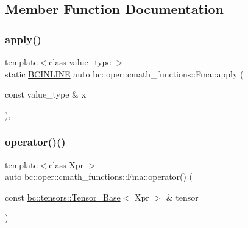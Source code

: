 \subsection{Member Function Documentation}
\mbox{\label{structbc_1_1oper_1_1cmath__functions_1_1Fma_aa1cd252de7fcdcc34a5f915522562711}} 
\subsubsection{\texorpdfstring{apply()}{apply()}}
{\footnotesize\ttfamily template$<$class value\+\_\+type $>$ \\
static \hyperlink{common_8h_a6699e8b0449da5c0fafb878e59c1d4b1}{B\+C\+I\+N\+L\+I\+NE} auto bc\+::oper\+::cmath\+\_\+functions\+::\+Fma\+::apply (\begin{DoxyParamCaption}\item[{const value\+\_\+type \&}]{x }\end{DoxyParamCaption})\hspace{0.3cm}{\ttfamily [inline]}, {\ttfamily [static]}}

\mbox{\label{structbc_1_1oper_1_1cmath__functions_1_1Fma_a24c07a2d716c633a7ef22ac804d806fd}} 
\subsubsection{\texorpdfstring{operator()()}{operator()()}\hspace{0.1cm}{\footnotesize\ttfamily [1/3]}}
{\footnotesize\ttfamily template$<$class Xpr $>$ \\
auto bc\+::oper\+::cmath\+\_\+functions\+::\+Fma\+::operator() (\begin{DoxyParamCaption}\item[{const \hyperlink{classbc_1_1tensors_1_1Tensor__Base}{bc\+::tensors\+::\+Tensor\+\_\+\+Base}$<$ Xpr $>$ \&}]{tensor }\end{DoxyParamCaption})\hspace{0.3cm}{\ttfamily [inline]}}

